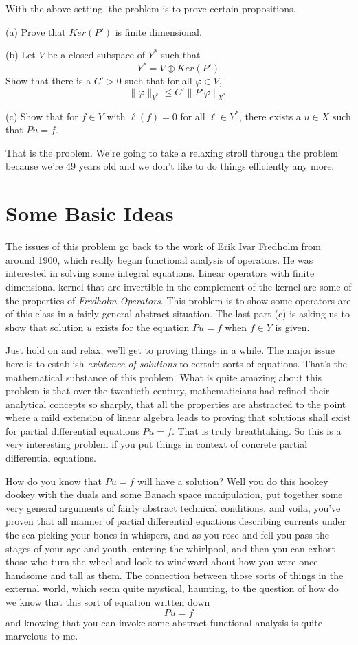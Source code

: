 \documentclass{amsart}
\begin{document}
With the above setting, the problem is to prove certain propositions.

(a)  Prove that $Ker(P')$ is finite dimensional.  

(b) Let $V$ be a closed subspace of $Y^*$ such that
\[
Y^* = V \oplus Ker(P')
\]
Show that there is a $C' >0$ such that for all $\varphi \in V$,
\[
\|\varphi\|_{Y^*} \le C' \| P' \varphi \|_{X^*}
\]

(c) Show that for $f\in Y$ with $\ell(f)=0$ for all $\ell \in Y^*$, there exists a $u \in X$ such that $Pu = f$.

That is the problem.  We're going to take a relaxing stroll through the problem because we're 49 years old and we don't like to do things efficiently any more.

\section{Some Basic Ideas}

The issues of this problem go back to the work of Erik Ivar Fredholm from around 1900, which really began functional analysis of operators.  He was interested in solving some integral equations.  Linear operators with finite dimensional kernel that are invertible in the complement of the kernel are some of the properties of {\em Fredholm Operators}.  This problem is to show some operators are of this class in a fairly general abstract situation.  The last part (c) is asking us to show that solution $u$ exists for the equation $Pu=f$ when $f \in Y$ is given.

Just hold on and relax, we'll get to proving things in a while.  The major issue here is to establish {\em existence of solutions} to certain sorts of equations.  That's the mathematical substance of this problem.  What is quite amazing about this problem is that over the twentieth century, mathematicians had refined their analytical concepts so sharply, that all the properties are abstracted to the point where a mild extension of linear algebra leads to proving that solutions shall exist for partial differential equations $Pu=f$.  That is truly breathtaking.  So this is a very interesting problem if you put things in context of concrete partial differential equations.  

How do you know that $Pu=f$ will have a solution?  Well you do this hookey dookey with the duals and some Banach space manipulation, put together some very general arguments of fairly abstract technical conditions, and voila, you've proven that all manner of partial differential equations describing currents under the sea picking your bones in whispers, and as you rose and fell you pass the stages of your age and youth, entering the whirlpool, and then you can exhort those who turn the wheel and look to windward about how you were once handsome and tall as them.  The connection between those sorts of things in the external world, which seem quite mystical, haunting, to the question of how do we know that this sort of equation written down 
\[
Pu = f
\]
and knowing that you can invoke some abstract functional analysis is quite marvelous to me.  
\end{document}
